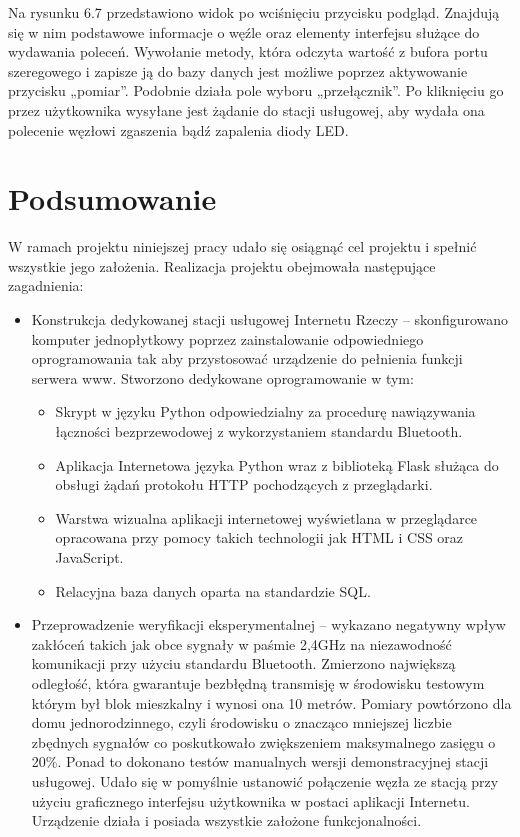 \documentclass[12pt, twoside, openany]{mwrep}
\begin{document}
\par
Na rysunku 6.7 przedstawiono widok po wciśnięciu przycisku podgląd. Znajdują się w nim podstawowe informacje o węźle oraz elementy interfejsu służące do wydawania poleceń. Wywołanie metody, która odczyta wartość z bufora portu szeregowego i zapisze ją do bazy danych jest możliwe poprzez aktywowanie przycisku „pomiar”. Podobnie działa pole wyboru „przełącznik”. Po kliknięciu go przez użytkownika wysyłane jest żądanie do stacji usługowej, aby wydała ona polecenie węzłowi zgaszenia bądź zapalenia diody LED.

\chapter{Podsumowanie}

W ramach projektu niniejszej pracy udało się osiągnąć cel projektu i spełnić wszystkie jego założenia. Realizacja projektu obejmowała następujące zagadnienia:
\begin{itemize}
\item	Konstrukcja dedykowanej stacji usługowej Internetu Rzeczy – skonfigurowano komputer jednopłytkowy poprzez zainstalowanie odpowiedniego oprogramowania tak aby przystosować urządzenie do pełnienia funkcji serwera www. Stworzono dedykowane oprogramowanie w tym:
\begin{itemize}
\item	 Skrypt w języku Python odpowiedzialny za procedurę nawiązywania łączności bezprzewodowej z wykorzystaniem standardu Bluetooth.
\item	Aplikacja Internetowa języka Python wraz z biblioteką Flask służąca do obsługi żądań protokołu HTTP pochodzących z przeglądarki.
\item	Warstwa wizualna aplikacji internetowej wyświetlana w przeglądarce opracowana przy pomocy takich technologii jak HTML i CSS oraz JavaScript.  
\item	Relacyjna baza danych oparta na standardzie SQL.
\end{itemize}
\item	Przeprowadzenie weryfikacji eksperymentalnej – wykazano negatywny wpływ zakłóceń takich jak obce sygnały w paśmie 2,4GHz na niezawodność komunikacji przy użyciu standardu Bluetooth. Zmierzono największą odległość, która gwarantuje bezbłędną transmisję w środowisku testowym którym był blok mieszkalny i wynosi ona 10 metrów. Pomiary powtórzono dla domu jednorodzinnego, czyli środowisku o znacząco mniejszej liczbie zbędnych sygnałów co poskutkowało zwiększeniem maksymalnego zasięgu o 20\%.
Ponad to dokonano testów manualnych wersji demonstracyjnej stacji usługowej. Udało się w pomyślnie ustanowić połączenie węzła ze stacją przy użyciu graficznego interfejsu użytkownika w postaci aplikacji Internetu. Urządzenie działa i posiada wszystkie założone funkcjonalności.
\end{itemize}
\end{document}
